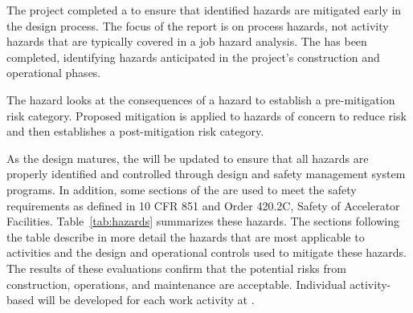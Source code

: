 The  project completed a 
to ensure that identified hazards are mitigated early in 
the design process.  The focus of the report is on process hazards,
not activity hazards that are typically covered in a job hazard
analysis.  The  has been completed, identifying
hazards anticipated in the project's construction and operational
phases.

The hazard  looks at the consequences of a hazard
to establish a pre-mitigation risk category. Proposed mitigation is
applied to hazards of concern to reduce risk and then establishes a
post-mitigation risk category.

As the  design matures, the  will be
updated to ensure that all hazards are properly identified and
controlled through design and safety management system programs.  In
addition, some sections of the  are used to meet
the safety requirements as defined in 10 CFR 851 and  Order
420.2C, Safety of Accelerator Facilities.  Table~\ref{tab:hazards}
summarizes these hazards.  The sections following the table describe
in more detail the hazards that are most applicable to 
activities and the design and operational controls used to mitigate
these hazards. The results of these evaluations confirm that the
potential risks from construction, operations, and maintenance are
acceptable. Individual activity-based  will be
developed for each work  activity at
.

